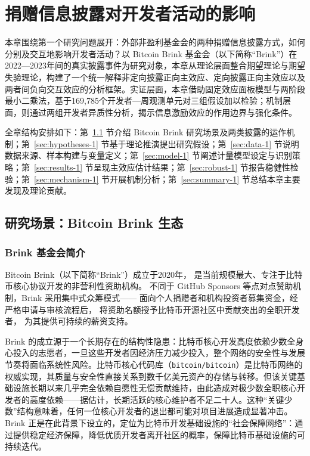 \chapter{捐赠信息披露对开发者活动的影响}

本章围绕第一个研究问题展开：外部非盈利基金会的两种捐赠信息披露方式，如何分别及交互地影响开发者活动？以 Bitcoin Brink 基金会（以下简称“Brink”）在2022—2023年间的真实披露事件为研究对象，本章从理论层面整合期望理论与期望失验理论，构建了一个统一解释非定向披露正向主效应、定向披露正向主效应以及两者间负向交互效应的分析框架。实证层面，本章借助固定效应面板模型与两阶段最小二乘法，基于169,785个开发者—周观测单元对三组假设加以检验；机制层面，则通过两组开发者异质性分析，揭示信息激励效应的作用边界与强化条件。

全章结构安排如下：第~\ref{sec:research-scene-1} 节介绍 Bitcoin Brink 研究场景及两类披露的运作机制；第~\ref{sec:hypotheses-1} 节基于理论推演提出研究假设；第~\ref{sec:data-1} 节说明数据来源、样本构建与变量定义；第~\ref{sec:model-1} 节阐述计量模型设定与识别策略；第~\ref{sec:results-1} 节呈现主效应估计结果；第~\ref{sec:robust-1} 节报告稳健性检验；第~\ref{sec:mechanism-1} 节开展机制分析；第~\ref{sec:summary-1} 节总结本章主要发现及理论贡献。

\section{研究场景：Bitcoin Brink 生态}
\label{sec:research-scene-1}

\subsection{Brink 基金会简介}

Bitcoin Brink（以下简称“Brink”）成立于2020年，
是当前规模最大、专注于比特币核心协议开发的非营利性资助机构。
不同于 GitHub Sponsors 等点对点赞助机制，Brink 采用集中式众筹模式——
面向个人捐赠者和机构投资者募集资金，经严格申请与审核流程后，
将资助名额授予比特币开源社区中贡献突出的全职开发者，
为其提供可持续的薪资支持。

Brink 的成立源于一个长期存在的结构性隐患：比特币核心开发高度依赖少数全身心投入的志愿者，一旦这些开发者因经济压力减少投入，整个网络的安全性与发展节奏将面临系统性风险。比特币核心代码库（\texttt{bitcoin/bitcoin}）是比特币网络的权威实现，其质量与安全性直接关系到数千亿美元资产的存储与转移。但该关键基础设施长期以来几乎完全依赖自愿性无偿贡献维持，由此造成对极少数全职核心开发者的高度依赖——据估计，长期活跃的核心维护者不足二十人。这种“关键少数”结构意味着，任何一位核心开发者的退出都可能对项目进展造成显著冲击。Brink 正是在此背景下设立的，定位为比特币开发基础设施的“社会保障网络”：通过提供稳定经济保障，降低优质开发者离开社区的概率，保障比特币基础设施的可持续迭代。

